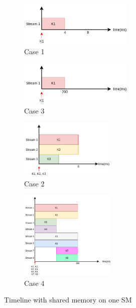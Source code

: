 \documentclass[conference]{IEEEtran}
\begin{document}
\begin{figure}[h]
   \centering
   \begin{subfigure}{0.4\textwidth}
      \includegraphics[width=\textwidth, height=60pt]{figs/shmem_1024_baseline.png}
      \caption{Case 1}
      \label{fig:shmem_case1}
   \end{subfigure}
   \begin{subfigure}{0.4\textwidth}
      \includegraphics[width=\textwidth, height=60pt]{figs/shmem_16384_baseline.png}
      \caption{Case 3}
      \label{fig:shmem_case3}
   \end{subfigure}
   \begin{subfigure}{0.38\textwidth}
      \includegraphics[width=\textwidth, height=80pt]{figs/shmem_1024.png}
      \caption{Case 2}
      \label{fig:shmem_case2}
  \end{subfigure}
   \begin{subfigure}{0.48\textwidth}
      \includegraphics[width=\textwidth, height=120pt]{figs/shmem_16384.png}
      \caption{Case 4}
      \label{fig:shmem_case4}
   \end{subfigure}
   \caption{Timeline with shared memory on one SM}
   \label{fig:shmem}
\end{figure}
\end{document}
